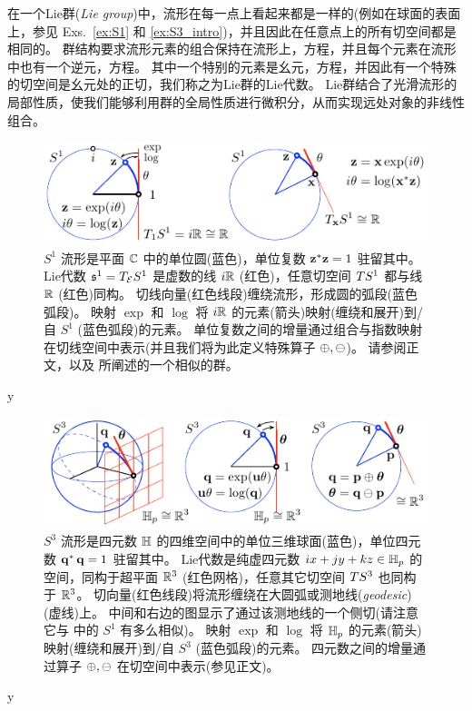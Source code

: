 在一个Lie群(\emph{Lie group})中，流形在每一点上看起来都是一样的(例如在球面的表面上，参见 Exs.~\ref{ex:S1} 和 \ref{ex:S3_intro})，并且因此在任意点上的所有切空间都是相同的。
群结构要求流形元素的组合保持在流形上，方程，并且每个元素在流形中也有一个逆元，方程。
其中一个特别的元素是幺元，方程，并因此有一个特殊的切空间是幺元处的正切，我们称之为Lie群的Lie代数。
Lie群结合了光滑流形的局部性质，使我们能够利用群的全局性质进行微积分，从而实现远处对象的非线性组合。


%
%
\begin{figure}[tb]
\centering
\includegraphics{figures/manifold_z}
\caption{$S^1$ 流形是平面 ${\mathbb C}$ 中的单位圆(蓝色)，单位复数 ${\bf z}^*{\bf z}=1$ 驻留其中。 
Lie代数 $\frak{s}^1=T_{\mathcal{E}}{S^1}$ 是虚数的线 $i{\mathbb R}$ (红色)，任意切空间 $TS^1$ 都与线 ${\mathbb R}$ (红色)同构。
切线向量(红色线段)缠绕流形，形成圆的弧段(蓝色弧段)。
映射 $\exp$ 和 $\log$ 将 $i{\mathbb R}$ 的元素(箭头)映射(缠绕和展开)到/自 $S^1$ (蓝色弧段)的元素。
单位复数之间的增量通过组合与指数映射在切线空间中表示(并且我们将为此定义特殊算子 $\oplus,\ominus$)。
请参阅正文，以及  所阐述的一个相似的群。
}
\label{fig:manifold_z}
\end{figure}
%

\if\examples y

\fi

\begin{figure}[t]
\centering
\includegraphics{figures/manifold_q}
\caption{$S^3$ 流形是四元数 ${\mathbb H}$ 的四维空间中的单位三维球面(蓝色)，单位四元数 ${\bf q}^*\,{\bf q}=1$ 驻留其中。
Lie代数是纯虚四元数 $ix+jy+kz\in{\mathbb H}_p$ 的空间，同构于超平面 ${\mathbb R}^3$ (红色网格)，任意其它切空间 $TS^3$ 也同构于 ${\mathbb R}^3$。
切向量(红色线段)将流形缠绕在大圆弧或测地线(\emph{geodesic})(虚线)上。
中间和右边的图显示了通过该测地线的一个侧切(请注意它与  中的 $S^1$ 有多么相似)。
映射 $\exp$ 和 $\log$ 将 ${\mathbb H}_p$ 的元素(箭头)映射(缠绕和展开)到/自 $S^3$ (蓝色弧段)的元素。
四元数之间的增量通过算子 $\oplus,\ominus$ 在切空间中表示(参见正文)。
}
\label{fig:manifold_q}
\end{figure}
%
\if\examples y

\fi



